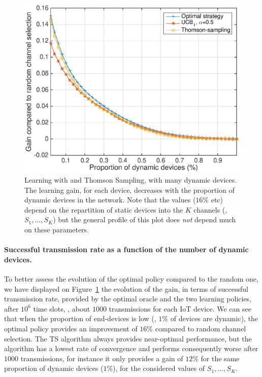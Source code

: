 \begin{figure}[!h]
    \centering
    \includegraphics[scale=0.65]{perf_learning.eps}
    \caption{Learning with \UCB{} and Thomson Sampling, with many dynamic devices.
        The learning gain, for each device, decreases with the proportion of dynamic devices in the network.
        Note that the values ($16\%$ etc) depend on the repartition of static devices into the $K$ channels (\ie, $S_1,\dots,S_K$) but the general profile of this plot does \emph{not} depend much on these parameters.
    }
    \label{fig:41:perf_learning}
\end{figure}


\paragraph{Successful transmission rate as a function of the number of dynamic devices.}
%
To better assess the evolution of the optimal policy compared to the random one, we have displayed on Figure~\ref{fig:41:perf_learning} the evolution of the gain, in terms of successful transmission rate, provided by the optimal oracle and the two learning policies, after $10^6$ time slots, \ie, about $1000$ transmissions for each IoT device.
We can see that when the proportion of end-devices is low (\eg, $1\%$ of devices are dynamic), the optimal policy provides an improvement of $16\%$ compared to random channel selection.
The TS algorithm always provides near-optimal performance, but the \UCB{} algorithm has a lowest rate of convergence and performs consequently worse after $1000$ transmissions, for instance it only provides a gain of $12\%$ for the same proportion of dynamic devices ($1\%$),
for the considered values of $S_1,\dots,S_K$.

